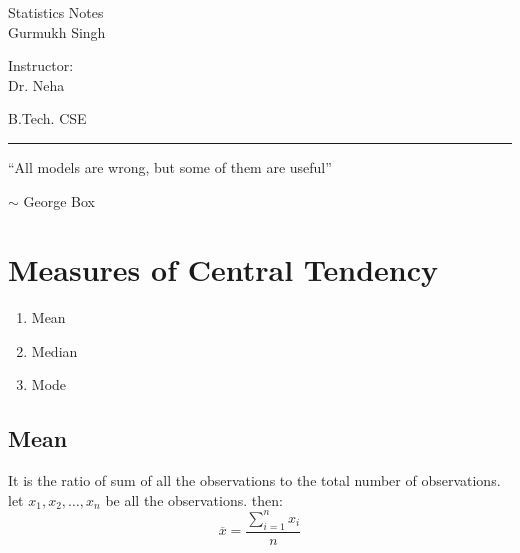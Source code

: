 \documentclass[11pt,letterpaper]{article}
\begin{document}
\begin{center}
  \Huge{Statistics Notes}\\
  \vspace{0.25cm}
  \small{Gurmukh Singh}
\end{center}

\vspace{-1.75cm}

\begin{flushright}
  Instructor: \\ Dr. Neha
\end{flushright}

\vspace{-1.3cm}

\begin{flushleft}
  B.Tech. CSE
\end{flushleft}

\rule{15.5cm}{0.1mm}%

\tableofcontents
\pagebreak


\begin{mdframed}[backgroundcolor=gray!20]
   ``All models are wrong, but some of them are useful''
   \begin{flushright}
     $\sim$ George Box
   \end{flushright}
\end{mdframed}

\section{Measures of Central Tendency}
\begin{enumerate}
  \item Mean
  \item Median
  \item Mode
\end{enumerate}

\subsection{Mean}
It is the ratio of sum of all the observations to the total number of observations.
let $x_1, x_2, \dots, x_n$ be all the observations. then:
\[
  \overline{x} =\frac{\sum_{i=1}^n x_i}{n}
\]
\end{document}

